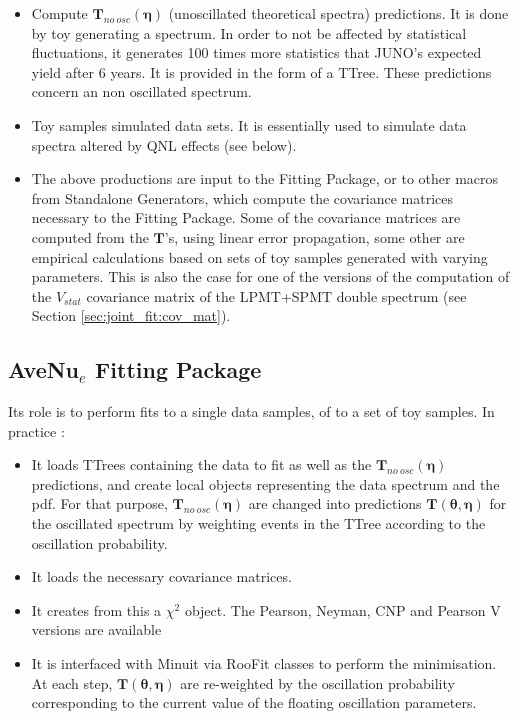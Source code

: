 \documentclass[../main.tex]{subfiles}
\begin{document}
\begin{itemize}
  \item Compute $\bm{T}_{no~osc}(\bm{\eta})$ (unoscillated theoretical spectra) predictions. It is done by toy generating a spectrum. In order to not be affected by statistical fluctuations, it generates 100 times more statistics that JUNO's expected yield after 6 years. It is provided in the form of a TTree. These predictions concern an non oscillated spectrum.

  \item Toy samples simulated data sets. It is essentially used to simulate data spectra altered by QNL effects (see below).

  \item The above productions are input to the Fitting Package, or to other macros from Standalone Generators, which compute the covariance matrices necessary to the Fitting Package. Some of the covariance matrices are computed from the $\bm{T}$'s, using linear error propagation, some other are empirical calculations based on sets of toy samples generated with varying parameters. This is also the case for one of the versions of the computation of the $V_{stat}$ covariance matrix of the LPMT+SPMT double spectrum (see Section \ref{sec:joint_fit:cov_mat}).
\end{itemize}



\subsection{AveNu$_e$ Fitting Package}

Its role is to perform fits to a single data samples, of to a set of toy samples. In practice :

\begin{itemize}
  \item It loads TTrees containing the data to fit as well as the $\bm{T}_{no~osc}(\bm{\eta})$ predictions, and create local objects representing the data spectrum and the pdf. For that purpose, $\bm{T}_{no~osc}(\bm{\eta})$ are changed into predictions $\bm{T}(\bm{\theta},\bm{\eta})$ for the oscillated spectrum by weighting events in the TTree according to the oscillation probability.
  \item It loads the necessary covariance matrices.
  \item It creates from this a $\chi^2$ object. The Pearson, Neyman, CNP and Pearson V versions are available

  \item It is interfaced with Minuit via RooFit classes to perform the minimisation. At each step, $\bm{T}(\bm{\theta},\bm{\eta})$ are re-weighted by the oscillation probability corresponding to the current value of the floating oscillation parameters.
\end{itemize}
\hfill
\end{document}
